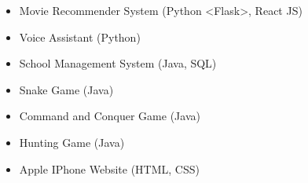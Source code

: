 \documentclass[10pt,a4paper,ragged2e,withhyper]{altacv}
\begin{document}
\begin{paracol}{2}
\begin{itemize}
\item Movie Recommender System (Python <Flask>, React JS)
\item Voice Assistant (Python)
\item School Management System (Java, SQL)
\item Snake Game (Java)
\item Command and Conquer Game (Java)
\item Hunting Game (Java)
\item Apple IPhone Website (HTML, CSS)
\end{itemize}



\end{paracol}
\end{document}
